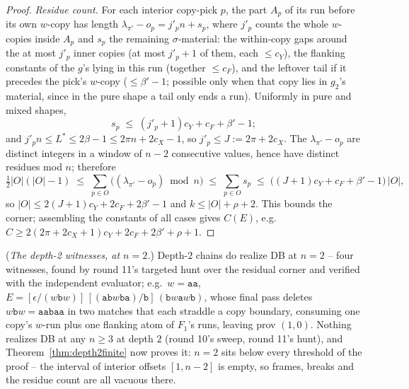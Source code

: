 \begin{proof}
    \emph{Residue count.}  For each interior copy-pick $p$, the part
    $A_p$ of its run before its own $w$-copy has length
    $\lambda_{\pi'} - o_p = j'_p n + s_p$, where $j'_p$ counts the
    whole $w$-copies inside $A_p$ and $s_p$ the remaining
    $\sigma$-material: the within-copy gaps around the at most
    $j'_p$ inner copies (at most $j'_p + 1$ of them, each $\leq
    c_Y$), the flanking constants of the $g$'s lying in this run
    (together $\leq c_F$), and the leftover tail if it precedes the
    pick's $w$-copy ($\leq \beta' - 1$; possible only when that copy
    lies in $g_2$'s material, since in the pure shape a tail only
    ends a run).  Uniformly in pure and mixed shapes,
    \[
    s_p \;\leq\; (j'_p + 1) c_Y + c_F + \beta' - 1 ;
    \]
    and $j'_p n \leq
    L^{*} \leq 2\beta - 1 \leq 2\pi n + 2c_X - 1$, so $j'_p \leq
    J := 2\pi + 2c_X$.  The $\lambda_{\pi'} - o_p$ are distinct
    integers in a window of $n - 2$ consecutive values, hence have
    distinct residues mod $n$; therefore
    \[
    \tfrac{1}{2} |O| (|O| - 1) \;\leq\; \sum_{p \in O}
    \bigl( (\lambda_{\pi'} - o_p) \bmod n \bigr) \;\leq\; \sum_{p \in
    O} s_p \;\leq\; \bigl((J+1) c_Y + c_F + \beta' - 1\bigr)\, |O|,
    \]
    so $|O| \leq 2(J+1) c_Y + 2c_F + 2\beta' - 1$ and $k \leq |O| +
    \rho + 2$.  This bounds the corner; assembling the constants of
    all cases gives
    $C(E)$, e.g.\ $C \geq 2(2\pi + 2c_X + 1) c_Y + 2c_F + 2\beta' +
    \rho + 1$.
\end{proof}

\begin{remark}
    \label{rem:witnesses2}
    (\emph{The depth-2 witnesses, at $n = 2$.})  Depth-$2$ chains do
    realize DB at $n = 2$ -- four witnesses, found by round 11's
    targeted hunt over the residual corner and verified with the
    independent evaluator; e.g.\ $w = \mathtt{aa}$,
    $E = [\epsilon/(w\mathtt{b}w)]\,
    [(\mathtt{ab}w\mathtt{ba})/\mathtt{b}]\,
    (\mathtt{b}w\mathtt{a}w\mathtt{b})$, whose final pass deletes
    $w\mathtt{b}w = \mathtt{aabaa}$ in two matches that each straddle
    a copy boundary, consuming one copy's $w$-run plus one flanking
    atom of $F_1$'s runs, leaving prov $(1, 0)$.  Nothing realizes DB
    at any $n \geq 3$ at depth $2$ (round 10's sweep, round 11's
    hunt), and Theorem~\ref{thm:depth2finite} now proves it: $n = 2$
    sits below every threshold of the proof -- the interval of
    interior offsets $[1, n-2]$ is empty, so frames, breaks and the
    residue count are all vacuous there.
\end{remark}

